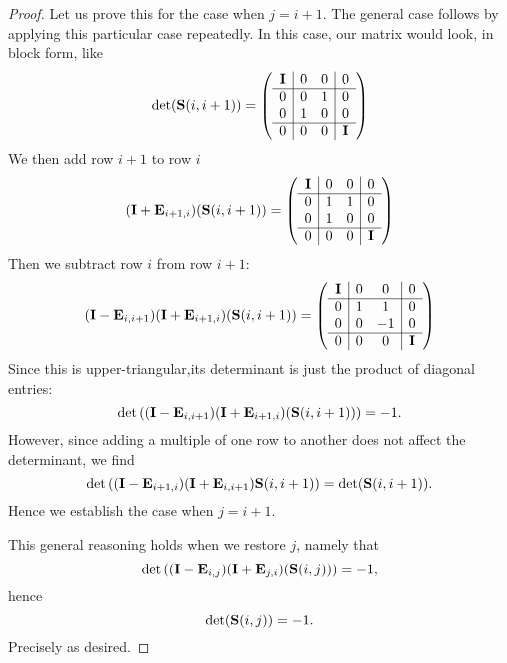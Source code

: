 \begin{proof}
Let us prove this for the case when $j=i+1$. The general case follows by
applying this particular case repeatedly.
In this case, our matrix would look, in block form, like
\begin{equation}
  \det(\mathbf{S}(i,i+1)) = \left(\begin{array}{c|cc|c}
    \mathbf{I} & 0  & 0 & 0\\\hline
    0 & 0 & 1 & 0\\
    0 & 1 & 0 & 0\\\hline
    0 & 0 & 0 & \mathbf{I}
  \end{array}\right)
\end{equation}
We then add row $i+1$ to row $i$
\begin{equation}
(\mathbf{I} + \mathbf{E}_{i+1,i})(\mathbf{S}(i,i+1)) = \left(\begin{array}{c|cc|c}
    \mathbf{I} & 0  & 0 & 0\\\hline
    0 & 1 & 1 & 0\\
    0 & 1 & 0 & 0\\\hline
    0 & 0 & 0 & \mathbf{I}
  \end{array}\right)
\end{equation}
Then we subtract row $i$ from row $i+1$:
\begin{equation}
(\mathbf{I} - \mathbf{E}_{i,i+1})(\mathbf{I} + \mathbf{E}_{i+1,i})(\mathbf{S}(i,i+1)) = \left(\begin{array}{c|cc|c}
    \mathbf{I} & 0  & 0 & 0\\\hline
    0 & 1 & 1 & 0\\
    0 & 0 & -1 & 0\\\hline
    0 & 0 & 0 & \mathbf{I}
  \end{array}\right)
\end{equation}
Since this is upper-triangular,its determinant is just the product of
diagonal entries:
\begin{equation}
\det\left((\mathbf{I} - \mathbf{E}_{i,i+1})(\mathbf{I} + \mathbf{E}_{i+1,i})(\mathbf{S}(i,i+1))\right)=-1.
\end{equation}
However, since adding a multiple of one row to another does not affect
the determinant, we find
\begin{equation}
\det\left((\mathbf{I} - \mathbf{E}_{i+1,i})(\mathbf{I} + \mathbf{E}_{i,i+1})\mathbf{S}(i,i+1)\right)=\det(\mathbf{S}(i,i+1)).
\end{equation}
Hence we establish the case when $j=i+1$.

This general reasoning holds when we restore $j$, namely that
\begin{equation}
\det\left((\mathbf{I} - \mathbf{E}_{i,j})(\mathbf{I} + \mathbf{E}_{j,i})(\mathbf{S}(i,j))\right)=-1,
\end{equation}
hence
\begin{equation}
\det(\mathbf{S}(i,j)) = -1.
\end{equation}
Precisely as desired.
\end{proof}

